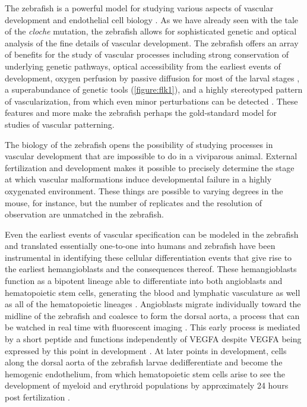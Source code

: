 The zebrafish is a powerful model for studying various aspects of vascular development and endothelial cell biology \citep{Wilkinson2014}. As we have already seen with the tale of the \textit{cloche} mutation, the zebrafish allows for sophisticated genetic and optical analysis of the fine details of vascular development. The zebrafish offers an array of benefits for the study of vascular processes including strong conservation of underlying genetic pathways, optical accessibility from the earliest events of development, oxygen perfusion by passive diffusion for most of the larval stages \citep{Ellertsdottir2010}, a superabundance of genetic tools (\autoref{figure:flk1}), and a highly stereotyped pattern of vascularization, from which even minor perturbations can be detected \citep{Jin2005}. These features and more make the zebrafish perhaps the gold\hyp{}standard model for studies of vascular patterning.

The biology of the zebrafish opens the possibility of studying processes in vascular development that are impossible to do in a viviparous animal. External fertilization and development makes it possible to precisely determine the stage at which vascular malformations induce developmental failure in a highly oxygenated environment. These things are possible to varying degrees in the mouse, for instance, but the number of replicates and the resolution of observation are unmatched in the zebrafish. 

Even the earliest events of vascular specification can be modeled in the zebrafish and translated essentially one\hyp{}to\hyp{}one into humans and zebrafish have been instrumental in identifying these cellular differentiation events that give rise to the earliest hemangioblasts and the consequences thereof. These hemangioblasts function as a bipotent lineage able to differentiate into both angioblasts and hematopoietic stem cells, generating the blood and lymphatic vasculature as well as all of the hematopoietic lineages \citep{Vogeli2006}. Angioblasts migrate individually toward the midline of the zebrafish and coalesce to form the dorsal aorta, a process that can be watched in real time with fluorescent imaging \citep{Lawson2002}. This early process is mediated by a short peptide and functions independently of VEGFA despite VEGFA being expressed by this point in development \citep{Nasevicius2000, Liang2001, Hogan2017}. At later points in development, cells along the dorsal aorta of the zebrafish larvae dedifferentiate and become the hemogenic endothelium, from which hematopoietic stem cells arise to see the development of myeloid and erythroid populations by approximately 24 hours post fertilization \citep{Gore2012}. 


